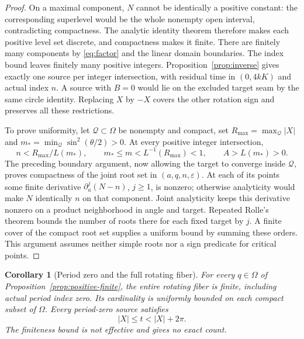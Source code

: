 \documentclass[11pt,a4paper]{article}
\newtheorem{corollary}[theorem]{Corollary}
\theoremstyle{remark}\newtheorem{remark}[theorem]{Remark}
\begin{document}
\begin{proof}
On a maximal component, $N$ cannot be identically a positive constant:
the corresponding superlevel would be the whole nonempty open interval,
contradicting compactness. The analytic identity theorem therefore
makes each positive level set discrete, and compactness makes it finite.
There are finitely many components by \eqref{eq:factor} and the linear
domain boundaries. The index bound leaves finitely many positive
integers. Proposition~\ref{prop:inverse} gives exactly one source per
integer intersection, with residual time in $(0,4kK)$ and actual index
$n$. A source with $B=0$ would lie on the excluded target seam by the
same circle identity. Replacing $X$ by $-X$ covers the other rotation
sign and preserves all these restrictions.

To prove uniformity, let $\mathcal Q\subset\Omega$ be nonempty and
compact, set $R_{\max}=\max_{\mathcal Q}|X|$ and
$m_*=\min_{\mathcal Q}\sin^2(\theta/2)>0$. At every positive integer
intersection,
\[
 n<R_{\max}/L(m_*),\qquad
 m_*\le m<L^{-1}(R_{\max})<1,\qquad A>L(m_*)>0.
\]
The preceding boundary argument, now allowing the target to converge
inside $\mathcal Q$, proves compactness of the joint root set in
$(a,q,n,\varepsilon)$. At each of its points some finite derivative
$\partial_a^j(N-n)$, $j\ge1$, is nonzero; otherwise analyticity would
make $N$ identically $n$ on that component. Joint analyticity keeps this
derivative nonzero on a product neighborhood in angle and target.
Repeated Rolle's theorem bounds the number of roots there for each
fixed target by $j$. A finite cover of the compact root set supplies
a uniform bound by summing these orders. This argument assumes neither
simple roots nor a sign predicate for critical points.
\end{proof}


\begin{corollary}[Period zero and the full rotating fiber]\label{cor:full-finite}
For every $q\in\Omega$ of Proposition~\ref{prop:positive-finite}, the
entire rotating fiber is finite, including actual period index zero.
Its cardinality is uniformly bounded on each compact subset of $\Omega$.
Every period-zero source satisfies
\begin{equation}\label{eq:zero-time-bound}
 |X|\le t<|X|+2\pi.
\end{equation}
The finiteness bound is not effective and gives no exact count.
\end{corollary}
\end{document}
